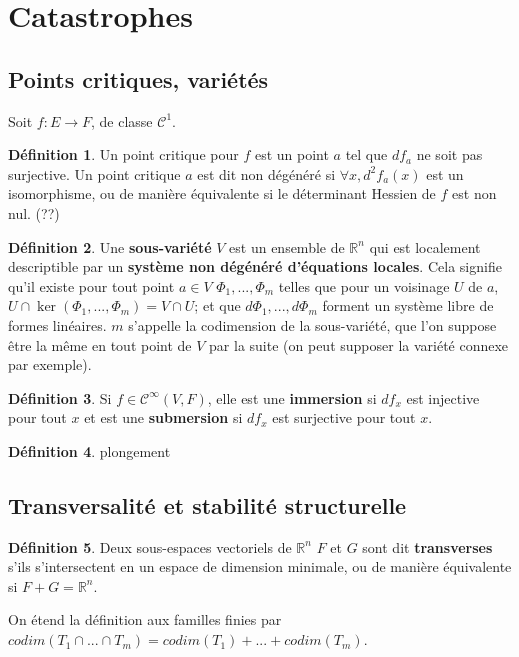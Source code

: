 \documentclass{article}
\newcommand{\cun}{\mathcal{C}^1}
\newcommand{\cinf}{\mathcal{C}^\infty}
\newcommand{\R}{\mathbb{R}}
\theoremstyle{definition}
\newtheorem{defn}{Définition}
\theoremstyle{plain}
\begin{document}
\section{Catastrophes}

\subsection{Points critiques, variétés}

Soit $f:E\to F$, de classe $\cun$.
\begin{defn}
	Un point critique pour $f$ est un point $a$ tel que $df_a$ ne soit pas surjective.
	Un point critique $a$ est dit non dégénéré si $\forall x, d^2f_a(x)$ est un isomorphisme, ou de manière équivalente si le déterminant Hessien de $f$ est non nul. (??)
\end{defn}

\begin{defn}
	Une \textbf{sous-variété} $V$ est un ensemble de $\R^n$ qui est localement descriptible par un \textbf{système non dégénéré d'équations locales}.
	Cela signifie qu'il existe pour tout point $a\in V$ $\Phi_1,...,\Phi_m$ telles que pour un voisinage $U$ de $a$, $U\cap\ker(\Phi_1,...,\Phi_m)=V\cap U$; et que $d\Phi_1,...,d\Phi_m$ forment un système libre de formes linéaires.
	$m$ s'appelle la codimension de la sous-variété, que l'on suppose être la même en tout point de $V$ par la suite (on peut supposer la variété connexe par exemple).
\end{defn}

\begin{defn}
	Si $f\in\cinf(V,F)$, elle est une \textbf{immersion} si $df_x$ est injective pour tout $x$ et est une \textbf{submersion} si $df_x$ est surjective pour tout $x$.
\end{defn}

\begin{defn}
	plongement
\end{defn}

\subsection{Transversalité et stabilité structurelle}

\begin{defn}
Deux sous-espaces vectoriels de $\R^n$ $F$ et $G$ sont dit \textbf{transverses} s'ils s'intersectent en un espace de dimension minimale, ou de manière équivalente si $F+G=\R^n$.

On étend la définition aux familles finies par $codim(T_1\cap...\cap T_m)=codim(T_1)+...+codim(T_m)$.
\end{defn}
\end{document}
